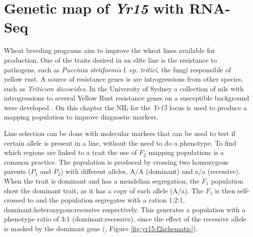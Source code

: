 
\chapter{Genetic map of \textit{Yr15} with RNA-Seq}
\label{yr15}
 
Wheat breeding programs aim to improve the wheat lines available for production.
One of the traits desired in an elite line is the resistance to pathogens, such as \textit{Puccinia striiformis} f. sp.  \textit{tritici}, the fungi responsible of yellow rust.
A source of resistance genes is are introgressions from other species, such as \textit{Triticum diccocides}. 
In the University of Sydney a collection of \glspl{nil} with introgressions to several Yellow Rust resistance genes on a susceptible background were developed \citep{Wellings1998}. 
On this chapter the NIL for the \textit{Yr15} locus is used to produce a mapping population to improve diagnostic markers. 



Line selection can be done with molecular markers that can be used to test if certain allele is present in a line, without the need to do a phenotype.
To find which regions are linked to a trait the use of $F_{2}$ mapping populations is a common practice.
The population is produced by crossing two homozygous parents ($P_1$ and $P_{2}$) with different alleles, A/A (dominant) and a/a (recessive).
When the trait is dominant and has a mendelian segregation, the $F_1$ population show the dominant trait, as it has a copy of each allele (A/a). 
The $F_1$ is then self-crossed to and the population segregates with a ration 1:2:1, dominant:heterozygous:recessive respectively.
This generates a population with a phenotype ratio of 3:1 (dominant:recessive), since the effect of the recessive allele is masked by the dominant gene (\citealt{VanOoijen2013}; Figure \ref{fig:yr15:f2schematic}).  

